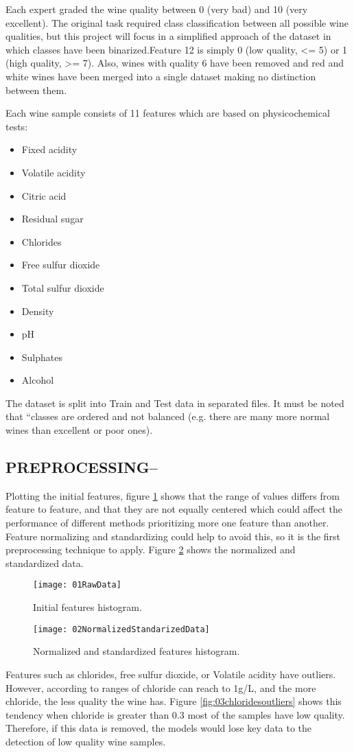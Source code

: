 \documentclass[12pt, twocolumn]{article}
\begin{document}
  Each expert graded the wine quality between 0 (very bad) and 10 (very
  excellent).
  The original task required class classification between all possible wine
  qualities, but this project will focus in a simplified approach of
  the dataset in which classes have been binarized.Feature 12 is simply 0
  (low quality, <= 5) or 1 (high quality, >= 7).
  Also, wines with quality 6 have been removed and red and white wines have
  been merged into a single dataset making no distinction between
  them.

  Each wine sample consists of 11 features which are based on
  physicochemical tests:
  \begin{itemize}
    \item Fixed acidity
    \item Volatile acidity
    \item Citric acid
    \item Residual sugar
    \item Chlorides
    \item Free sulfur dioxide
    \item Total sulfur dioxide
    \item Density
    \item pH
    \item Sulphates
    \item Alcohol
  \end{itemize}
  The dataset is split into Train and Test data in separated files.
  It must be noted that “classes are ordered and not balanced (e.g. there
  are many more normal wines than excellent or poor ones).

  \subsection{PREPROCESSING--}
  Plotting the initial features, figure \ref{01RawData} shows that
  the range of values differs from feature to feature, and that they are not
  equally centered which could affect the performance of different methods
  prioritizing more one feature than another.
  Feature normalizing and standardizing could help to avoid this, so it is
  the first preprocessing technique to apply. Figure
  \ref{02NormalizedStandarizedData} shows the normalized and standardized data.
  \begin{figure}[ht]
    \centering
    \texttt{[image: 01RawData]}
    \caption{Initial features histogram.}
    \label{01RawData}
  \end{figure}
  \begin{figure}[ht]
    \centering
    \texttt{[image: 02NormalizedStandarizedData]}
    \caption{Normalized and standardized features histogram.}
    \label{02NormalizedStandarizedData}
  \end{figure}
  Features such as chlorides, free sulfur dioxide, or Volatile acidity
  have outliers. However, according to\cite{Chloride} ranges of chloride can
  reach
  to 1g/L, and the more chloride, the less quality the wine has. Figure
  \ref{fig:03chloridesoutliers} shows this tendency when chloride is greater
  than
  0.3 most of the samples have low quality.
  Therefore, if this data is removed, the models would lose key data to the
  detection of low quality wine samples.
\end{document}

